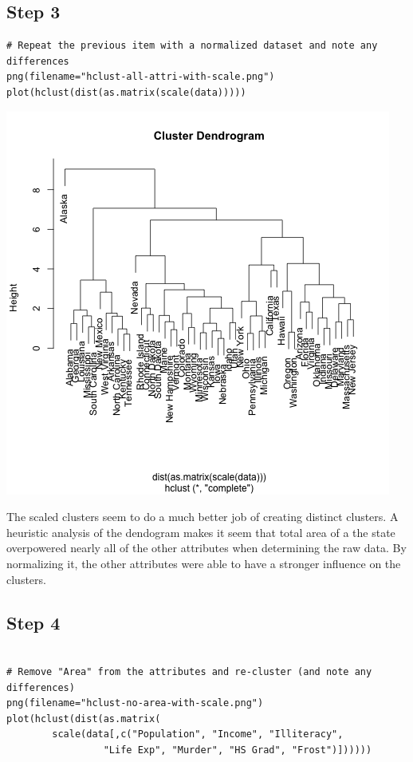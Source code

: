 \documentclass[11pt]{article}
\begin{document}
\subsection*{Step 3}
\label{sec:orgea78e1c}
\begin{verbatim}
# Repeat the previous item with a normalized dataset and note any differences
png(filename="hclust-all-attri-with-scale.png")
plot(hclust(dist(as.matrix(scale(data)))))
\end{verbatim}

\begin{center}
\includegraphics[width=.9\linewidth]{hclust-all-attri-with-scale.png}
\end{center}

The scaled clusters seem to do a much better job of creating distinct clusters.
A heuristic analysis of the dendogram makes it seem that total area of a the
state overpowered nearly all of the other attributes when determining the raw
data. By normalizing it, the other attributes were able to have a stronger
influence on the clusters.
\subsection*{Step 4}
\label{sec:orgbdc12be}
\begin{verbatim}

# Remove "Area" from the attributes and re-cluster (and note any differences)
png(filename="hclust-no-area-with-scale.png")
plot(hclust(dist(as.matrix(
        scale(data[,c("Population", "Income", "Illiteracy",
                 "Life Exp", "Murder", "HS Grad", "Frost")])))))
\end{verbatim}
\end{document}
